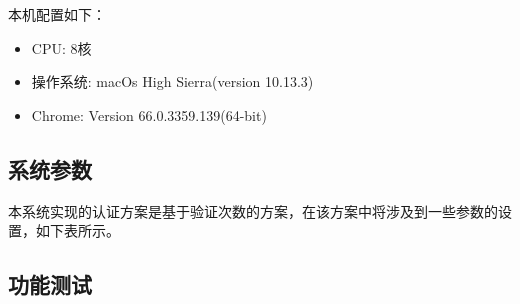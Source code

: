 本机配置如下：
\begin{itemize}
	\item CPU: 8核
	\item 操作系统: macOs High Sierra(version 10.13.3)
	\item Chrome: Version 66.0.3359.139(64-bit)
\end{itemize}


\subsection{系统参数}

本系统实现的认证方案是基于验证次数的方案，在该方案中将涉及到一些参数的设置，如下表所示。


 


\subsection{功能测试}



